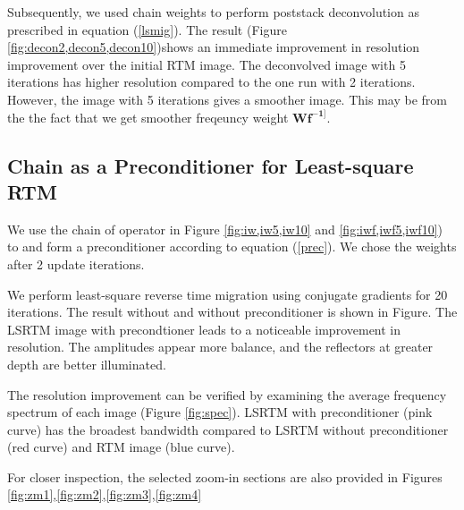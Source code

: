 Subsequently, we used chain weights to perform poststack deconvolution as prescribed in equation (\ref{lsmig}). The result (Figure \ref{fig:decon2,decon5,decon10})shows an immediate improvement in resolution improvement over the initial RTM image. The deconvolved image with 5 iterations has higher resolution compared to the one run with 2 iterations. However, the image with 5 iterations gives a smoother image. This may be from the the fact that we get smoother freqeuncy weight $\mathbf{Wf^{-1]}}$.


%
%

\subsection{Chain as a Preconditioner for Least-square RTM}

We use the chain of operator in Figure \ref{fig:iw,iw5,iw10} and \ref{fig:iwf,iwf5,iwf10}) to and form a preconditioner according to equation (\ref{prec}). We chose the weights after 2 update iterations.

We perform least-square reverse time migration using conjugate gradients for 20 iterations. The result without and without preconditioner is shown in Figure. The LSRTM image with precondtioner leads to a noticeable improvement in resolution. The amplitudes appear more balance, and the reflectors at greater depth are better illuminated. 


%

The resolution improvement can be verified by examining the average frequency spectrum of each image (Figure \ref{fig:spec}). LSRTM with preconditioner (pink curve) has the broadest bandwidth compared to LSRTM without preconditioner (red curve) and RTM image (blue curve). 



%

For closer inspection, the selected zoom-in sections are also provided in Figures \ref{fig:zm1},\ref{fig:zm2},\ref{fig:zm3},\ref{fig:zm4}


